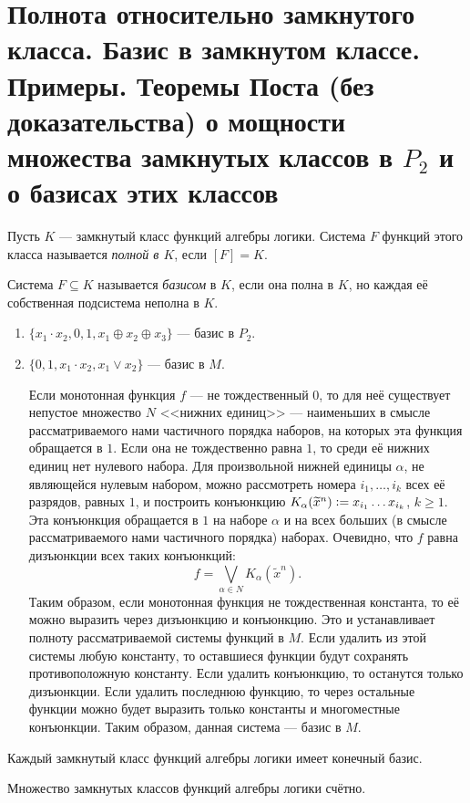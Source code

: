 \section{Полнота относительно замкнутого класса. Базис в замкнутом классе. Примеры. Теоремы Поста (без доказательства) о мощности множества замкнутых классов в $P_2$ и о базисах этих классов}

\begin{definition}
    Пусть $K$ --- замкнутый класс функций алгебры логики. Система $F$ функций этого класса называется \textit{полной в $K$}, если $[F] = K$.
\end{definition}

\begin{definition}
    Система $F \subseteq K$ называется \textit{базисом} в $K$, если она полна в $K$, но каждая её собственная подсистема неполна в $K$.
\end{definition}

\begin{example}
    \begin{enumerate}
        \item $\{x_1 \cdot x_2, 0, 1, x_1 \oplus x_2 \oplus x_3\}$ --- базис в $P_2$.
        \item $\{0, 1, x_1 \cdot x_2, x_1 \vee x_2\}$ --- базис в $M$.

            Если монотонная функция $f$ --- не тождественный $0$, то для неё существует непустое множество $N$ <<нижних единиц>> --- наименьших в смысле рассматриваемого нами частичного порядка наборов, на которых эта функция обращается в $1$. Если она не тождественно равна $1$, то среди её нижних единиц нет нулевого набора. Для произвольной нижней единицы $\alpha$, не являющейся нулевым набором, можно рассмотреть номера $i_1, \ldots, i_k$ всех её разрядов, равных $1$, и построить конъюнкцию $K_\alpha(\widetilde{x}^n) \vcentcolon = x_{i_1}\ldots x_{i_k}$, $k \geqslant 1$. Эта конъюнкция обращается в $1$ на наборе $\alpha$ и на всех больших (в смысле рассматриваемого нами частичного порядка) наборах. Очевидно, что $f$ равна дизъюнкции всех таких конъюнкций:
            \[
                f = \bigvee_{\alpha \in N}K_\alpha(\widetilde{x}^n).
            \]
            Таким образом, если монотонная функция не тождественная константа, то её можно выразить через дизъюнкцию и конъюнкцию. Это и устанавливает полноту рассматриваемой системы функций в $M$. Если удалить из этой системы любую константу, то оставшиеся функции будут сохранять противоположную константу. Если удалить конъюнкцию, то останутся только дизъюнкции. Если удалить последнюю функцию, то через остальные функции можно будет выразить только константы и многоместные конъюнкции. Таким образом, данная система --- базис в $M$.
    \end{enumerate}
\end{example}

\begin{theorem}[Пост]
    Каждый замкнутый класс функций алгебры логики имеет конечный базис.
\end{theorem}

\begin{theorem}[Пост]
    Множество замкнутых классов функций алгебры логики счётно.
\end{theorem}

